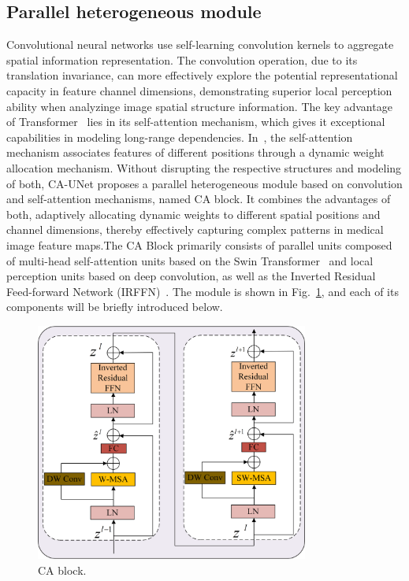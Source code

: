\subsection{Parallel heterogeneous module}

Convolutional neural networks use self-learning convolution kernels to aggregate spatial information representation. The convolution operation, due to its translation invariance, can more effectively explore the potential representational capacity in feature channel dimensions, demonstrating superior local perception ability when analyzinge image spatial structure information. The key advantage of Transformer~\cite{vaswani2017attention} lies in its self-attention mechanism, which gives it exceptional capabilities in modeling long-range dependencies. In~\cite{vaswani2017attention,liu2021swin}, the self-attention mechanism associates features of different positions through a dynamic weight allocation mechanism. Without disrupting the respective structures and modeling of both, CA-UNet proposes a parallel heterogeneous module based on convolution and self-attention mechanisms, named CA block. It combines the advantages of both, adaptively allocating dynamic weights to different spatial positions and channel dimensions, thereby effectively capturing complex patterns in medical image feature maps.The CA Block primarily consists of parallel units composed of multi-head self-attention units based on the Swin Transformer~\cite{liu2021swin} and local perception units based on deep convolution, as well as the Inverted Residual Feed-forward Network (IRFFN)~\cite{guo2022cmt}. The module is shown in Fig.~\ref{ca_block}, and each of its components will be briefly introduced below.


\begin{figure}[htbp]
    \centering
    \includegraphics[width=0.8\textwidth]{images/ca_block.png}
    \caption{CA block.} \label{ca_block}
    \end{figure}

